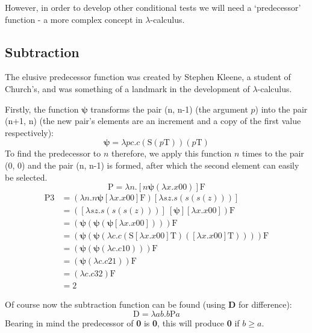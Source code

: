 \documentclass[Master.tex]{subfiles}
\begin{document}
However, in order to develop other conditional tests we will need a `predecessor' function - a more complex concept in $\lambda$-calculus.
\subsection{Subtraction}

The elusive predecessor function was created by Stephen Kleene, a student of Church's, and was something of a landmark in the development of $\lambda$-calculus.

Firstly, the function $\bm{\psi}$ transforms the pair (n, n-1) (the argument $p$) into the pair (n+1, n) (the new pair's elements are an increment and a copy of the first value respectively):
\cite{rojas2015lambdatutorial}
\begin{equation*}
\bm{\psi} = \lambda pc.c(\bm{\mathrm{S}}(p\bm{\mathrm{T}}))(p\bm{\mathrm{T}})
\end{equation*}
To find the predecessor to $n$ therefore, we apply this function $n$ times to the pair (0, 0) and the pair (n, n-1) is formed, after which the second element can easily be selected.
\cite{rojas2015lambdatutorial}
\begin{equation*}
\bm{\mathrm{P}} = \lambda n.[n \bm{\psi} (\lambda x.x\bm{\mathrm{00}})] \bm{\mathrm{F}} 
\end{equation*}
\begin{equation*}
\begin{aligned}
\bm{\mathrm{P3}} &= (\lambda n.n \bm{\psi} [\lambda x.x\bm{\mathrm{00}}] \bm{\mathrm{F}}) [\lambda sz.s(s(s(z)))]\\
&= ([\lambda sz.s(s(s(z)))]\ [\bm{\psi}] [\lambda x.x\bm{\mathrm{00}}]) \bm{\mathrm{F}}\\
&= (\bm{\psi}(\bm{\psi}(\bm{\psi}[\lambda x.x\bm{\mathrm{00}}])))\bm{\mathrm{F}}\\
&= (\bm{\psi}(\bm{\psi}(\lambda c.c(\bm{\mathrm{S}}[\lambda x.x\bm{\mathrm{00}}]\bm{\mathrm{T}})([\lambda x.x\bm{\mathrm{00}}]\bm{\mathrm{T}}))))\bm{\mathrm{F}}\\
&= (\bm{\psi}(\bm{\psi}(\lambda c.c\bm{\mathrm{10}})))\bm{\mathrm{F}}\\
&= (\bm{\psi}(\lambda c.c\bm{\mathrm{21}}))\bm{\mathrm{F}}\\
&= (\lambda c.c\bm{\mathrm{32}})\bm{\mathrm{F}}\\
&= \bm{\mathrm{2}}
\end{aligned}
\end{equation*}

Of course now the subtraction function can be found (using \textbf{D} for difference):
\begin{equation*}
\bm{\mathrm{D}} = \lambda ab.b\bm{\mathrm{P}}a
\end{equation*}
Bearing in mind the predecessor of \textbf{0} is \textbf{0}, this will produce \textbf{0} if $b\geq a$.
\end{document}
